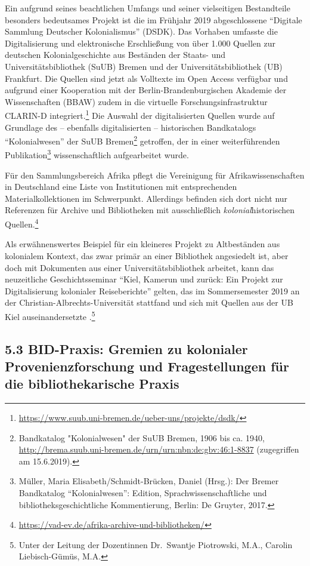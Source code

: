 \documentclass[a4paper,
fontsize=11pt,
oneside,
numbers=noperiodatend,
parskip=half-,
bibliography=totoc,
final
]{scrartcl}
\begin{document}
Ein aufgrund seines beachtlichen Umfangs und seiner vielseitigen
Bestandteile besonders bedeutsames Projekt ist die im Frühjahr 2019
abgeschlossene \enquote{Digitale Sammlung Deutscher Kolonialismus}
(DSDK). Das Vorhaben umfasste die Digitalisierung und elektronische
Erschließung von über 1.000 Quellen zur deutschen Kolonialgeschichte aus
Beständen der Staats- und Universitätsbibliothek (SuUB) Bremen und der
Universitätsbibliothek (UB) Frankfurt. Die Quellen sind jetzt als
Volltexte im Open Access verfügbar und aufgrund einer Kooperation mit
der Berlin-Brandenburgischen Akademie der Wissenschaften (BBAW) zudem in
die virtuelle Forschungsinfrastruktur CLARIN-D integriert.\footnote{\url{https://www.suub.uni-bremen.de/ueber-uns/projekte/dsdk/}}
Die Auswahl der digitalisierten Quellen wurde auf Grundlage des --
ebenfalls digitalisierten -- historischen Bandkatalogs
\enquote{Kolonialwesen} der SuUB Bremen\footnote{Bandkatalog
  "Kolonialwesen" der SuUB Bremen, 1906 bis ca. 1940,
  \url{http://brema.suub.uni-bremen.de/urn/urn:nbn:de:gbv:46:1-8837}
  (zugegriffen am 15.6.2019).} getroffen, der in einer weiterführenden
Publikation\footnote{Müller, Maria Elisabeth/Schmidt-Brücken, Daniel
  (Hrsg.): Der Bremer Bandkatalog \enquote{Kolonialwesen}: Edition,
  Sprachwissenschaftliche und bibliotheksgeschichtliche Kommentierung,
  Berlin: De Gruyter, 2017.} wissenschaftlich aufgearbeitet wurde.

Für den Sammlungsbereich Afrika pflegt die Vereinigung für
Afrikawissenschaften in Deutschland eine Liste von Institutionen mit
entsprechenden Materialkollektionen im Schwerpunkt. Allerdings befinden
sich dort nicht nur Referenzen für Archive und Bibliotheken mit
ausschließlich \emph{kolonial}historischen Quellen.\footnote{\url{https://vad-ev.de/afrika-archive-und-bibliotheken/}}

Als erwähnenswertes Beispiel für ein kleineres Projekt zu Altbeständen
aus kolonialem Kontext, das zwar primär an einer Bibliothek angesiedelt
ist, aber doch mit Dokumenten aus einer Universitätsbibliothek arbeitet,
kann das neuzeitliche Geschichtsseminar \enquote{Kiel, Kamerun und
zurück: Ein Projekt zur Digitalisierung kolonialer Reiseberichte}
gelten, das im Sommersemester 2019 an der
Christian-Albrechts-Universität stattfand und sich mit Quellen aus der
UB Kiel auseinandersetzte .\footnote{Unter der Leitung der Dozentinnen
  Dr.~Swantje Piotrowski, M.A., Carolin Liebisch-Gümüs, M.A.}

\hypertarget{bid-praxis-gremien-zu-kolonialer-provenienzforschung-und-fragestellungen-fuxfcr-die-bibliothekarische-praxis}{%
\subsection{5.3 BID-Praxis: Gremien zu kolonialer Provenienzforschung und
Fragestellungen für die bibliothekarische
Praxis}\label{bid-praxis-gremien-zu-kolonialer-provenienzforschung-und-fragestellungen-fuxfcr-die-bibliothekarische-praxis}}
\end{document}
